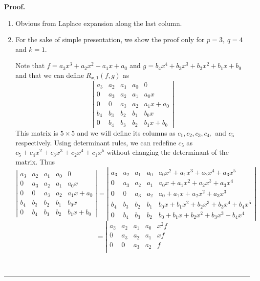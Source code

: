 \documentclass{article}%
\newenvironment{proof}[1][Proof]{\noindent\textbf{#1.} }{\ \rule{0.5em}{0.5em}}
\begin{document}
\begin{proof}

\begin{enumerate}
\item Obvious from Laplace expansion along the last column.

\item For the sake of simple presentation, we show the proof only for
$p=3,\ q=4$ and $k=1$.

\noindent Note that $f=a_3x^3+a_2x^2+a_1x+a_0$ and $g=b_4x^4+b_3x^3+b_2x^2+b_1x+b_0$ and that we can define $R_{x,1}(f,g)$ as
\[
\left|
\begin{array}{ccccc}
    a_3 & a_2 & a_1 & a_0 & 0 \\
    0 & a_3 & a_2 & a_1 & a_0x \\
    0 & 0 & a_3 & a_2 & a_1x+a_0 \\
    b_4 & b_3 & b_2 & b_1 & b_0x \\
    0 & b_4 & b_3 & b_2 & b_1x+b_0
\end{array}
\right|
\]
This matrix is $5\times5$ and we will define its columns as $c_1,c_2,c_3,c_4,$ and $c_5$ respectively. Using determinant rules, we can redefine $c_5$ as $c_5+c_4x^2+c_3x^3+c_2x^4+c_1x^5$ without changing the determinant of the matrix. Thus
\[
\left|
\begin{array}{ccccc}
    a_3 & a_2 & a_1 & a_0 & 0 \\
    0 & a_3 & a_2 & a_1 & a_0x \\
    0 & 0 & a_3 & a_2 & a_1x+a_0 \\
    b_4 & b_3 & b_2 & b_1 & b_0x \\
    0 & b_4 & b_3 & b_2 & b_1x+b_0
\end{array}
\right| = \left|
\begin{array}{ccccc}
    a_3 & a_2 & a_1 & a_0 & a_0x^2+a_1x^3+a_2x^4+a_3x^5 \\
    0 & a_3 & a_2 & a_1 & a_0x+a_1x^2+a_2x^3+a_3x^4 \\
    0 & 0 & a_3 & a_2 & a_0+a_1x+a_2x^2+a_3x^3 \\
    b_4 & b_3 & b_2 & b_1 & b_0x+b_1x^2+b_2x^3+b_3x^4+b_4x^5 \\
    0 & b_4 & b_3 & b_2 & b_0+b_1x+b_2x^2+b_3x^3+b_4x^4
\end{array}
\right|\]\[ = \left|
\begin{array}{ccccc}
    a_3 & a_2 & a_1 & a_0 & x^2f \\
    0 & a_3 & a_2 & a_1 & xf \\
    0 & 0 & a_3 & a_2 & f \\

\end{array}\]
\end{enumerate}
\end{proof}
\end{document}
